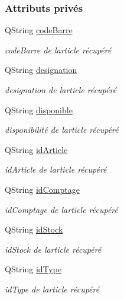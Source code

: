 \subsubsection*{Attributs privés}
\begin{DoxyCompactItemize}
\item 
Q\+String \hyperlink{class_article_a28db45ee4a48155c297be5c7c2eb54b9}{code\+Barre}
\begin{DoxyCompactList}\small\item\em code\+Barre de l\textquotesingle{}article récupéré \end{DoxyCompactList}\item 
Q\+String \hyperlink{class_article_a46a953cc2b35c8d868b27e8fa21c7a3a}{designation}
\begin{DoxyCompactList}\small\item\em designation de l\textquotesingle{}article récupéré \end{DoxyCompactList}\item 
Q\+String \hyperlink{class_article_ac361aa1f57e32243854735e84c6891e2}{disponible}
\begin{DoxyCompactList}\small\item\em disponibilité de l\textquotesingle{}article récupéré \end{DoxyCompactList}\item 
Q\+String \hyperlink{class_article_a9f2f7a04139f26accec145066a5aacae}{id\+Article}
\begin{DoxyCompactList}\small\item\em id\+Article de l\textquotesingle{}article récupéré \end{DoxyCompactList}\item 
Q\+String \hyperlink{class_article_adc8cef4c963c0fcc6d486dab4bd60e17}{id\+Comptage}
\begin{DoxyCompactList}\small\item\em id\+Comptage de l\textquotesingle{}article récupéré \end{DoxyCompactList}\item 
Q\+String \hyperlink{class_article_afb7785930598d5fbdafb707acdd3eec1}{id\+Stock}
\begin{DoxyCompactList}\small\item\em id\+Stock de l\textquotesingle{}article récupéré \end{DoxyCompactList}\item 
Q\+String \hyperlink{class_article_a1586203d0eb334a3298ca719f924083d}{id\+Type}
\begin{DoxyCompactList}\small\item\em id\+Type de l\textquotesingle{}article récupéré \end{DoxyCompactList}\item 

\end{DoxyCompactItemize}
